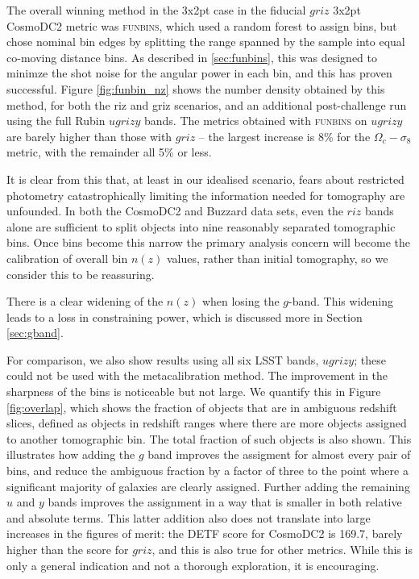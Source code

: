 \documentclass[twocolumn,twocolappendix]{aastex63}
\begin{document}
The overall winning method in the 3x2pt case in the fiducial $griz$ 3x2pt CosmoDC2 metric was \textsc{funbins},
which used a random forest to assign bins, but chose nominal bin edges by splitting the range spanned
by the sample into equal co-moving distance bins. As described in \autoref{sec:funbins},  this was designed
to minimze the shot noise for the angular power in each bin, and this has proven successful. 
Figure \ref{fig:funbin_nz} shows the number density obtained by this method, for both the riz and griz 
scenarios, and an additional post-challenge run using the full Rubin $ugrizy$ bands.  The metrics
obtained with \textsc{funbins} on $ugrizy$ are barely higher than those with $griz$ -- the largest
increase is 8\% for the $\Omega_c-\sigma_8$ metric, with the remainder all 5\% or less.

It is clear from this that, at least in our idealised scenario,  fears about restricted photometry 
catastrophically limiting
the information needed for tomography are unfounded.
In both the CosmoDC2 and Buzzard data sets,
even the $riz$ bands alone are sufficient to split objects into nine reasonably separated
tomographic bins.  Once bins become this narrow the primary analysis concern will become the calibration 
of overall bin $n(z)$ values, rather than initial tomography, so we consider this to be reassuring.

There is a clear widening of the $n(z)$ when losing the $g$-band.  This widening leads to a loss in 
constraining power, which is discussed more in Section \ref{sec:gband}.

For comparison, we also show results using all six LSST bands, $ugrizy$; these could not be used
with the metacalibration method. The improvement in the sharpness of the bins is noticeable but not large.
We quantify this in Figure \ref{fig:overlap}, which shows the fraction of objects that are in ambiguous
redshift slices, defined as objects in redshift ranges where there are more objects assigned to another 
tomographic bin.  The total fraction of such objects is also shown. This illustrates how adding the $g$ band 
improves the assigment
for almost every pair of bins, and reduce the ambiguous fraction by a factor of three to the 
point where a significant majority of galaxies are clearly assigned.  Further adding the remaining $u$ and $y$
bands improves the assignment in a way that is smaller in both relative and absolute terms.
This latter addition also does not translate into large increases in the figures of merit: the 
DETF score for CosmoDC2 is 169.7, barely higher than the score for $griz$, and this is also true for other 
metrics.   While this is only a general indication and not a thorough exploration, it is encouraging.
\end{document}
